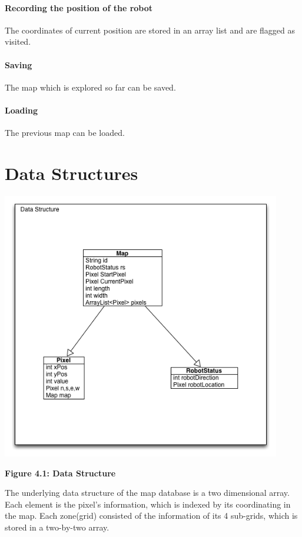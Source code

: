 \documentclass[11pt, a4paper]{report}
\begin{document}
\paragraph{Recording the position of the robot}

The coordinates of current position are stored in an array list and are flagged as visited.

\paragraph{Saving}

The map which is explored so far can be saved.

\paragraph{Loading}

The previous map can be loaded.


\section{Data Structures}
 \begin{center}
 \includegraphics[width=12.20cm]{DataStructures.png}
\end{center}
\begin{center}
\textbf {Figure 4.1: Data Structure} \\[0.3cm]
\end{center}
The underlying data structure of the map database is a two dimensional array. Each element
is the pixel's information, which is indexed by its coordinating in the map. Each zone(grid)
consisted of the information of its 4 sub-grids, which is stored in a two-by-two array.
\end{document}
